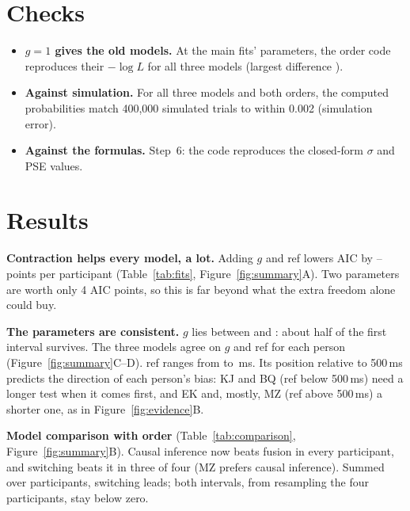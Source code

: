 \documentclass[11pt,a4paper]{article}
\newcommand{\step}[1]{\section{#1}}
\begin{document}
\step{Checks}
\begin{itemize}
  \item \textbf{$g = 1$ gives the old models.} At the main fits' parameters, the order code reproduces
        their $-\log L$ for all three models (largest difference \checkMaxDiff).
  \item \textbf{Against simulation.} For all three models and both orders, the computed probabilities
        match 400{,}000 simulated trials to within 0.002 (simulation error).
  \item \textbf{Against the formulas.} Step~6: the code reproduces the closed-form $\sigma$ and PSE
        values.
\end{itemize}

\step{Results}

\textbf{Contraction helps every model, a lot.} Adding $g$ and ref lowers AIC by \gainMin--\gainMax{}
points per participant (Table~\ref{tab:fits}, Figure~\ref{fig:summary}A). Two parameters are worth only
4 AIC points, so this is far beyond what the extra freedom alone could buy.

\textbf{The parameters are consistent.} $g$ lies between \gMin{} and \gMax{}: about half of the first
interval survives. The three models agree on $g$ and ref for each person
(Figure~\ref{fig:summary}C--D). ref ranges from  to \,ms. Its position relative to
500\,ms predicts the direction of each person's bias: KJ and BQ (ref below 500\,ms) need a longer test
when it comes first, and EK and, mostly, MZ (ref above 500\,ms) a shorter one, as in Figure~\ref{fig:evidence}B.

\begin{table}[h]
  \centering\small
  \TableFits
  \caption{Fits with and without order. Gain: AIC with order minus without (negative: order helps).}
  \label{tab:fits}
\end{table}

\textbf{Model comparison with order} (Table~\ref{tab:comparison}, Figure~\ref{fig:summary}B). Causal
inference now beats fusion in every participant, and switching beats it in three of four (MZ prefers
causal inference). Summed over participants, switching leads; both intervals, from resampling the four
participants, stay below zero.

\begin{table}[h]
  \centering\small
  \TableComparison
  \caption{$\Delta$AIC against forced fusion, all models with contraction (negative: better than
  fusion). Summed: with a 95\% interval from resampling participants.}
  \label{tab:comparison}
\end{table}
\end{document}
